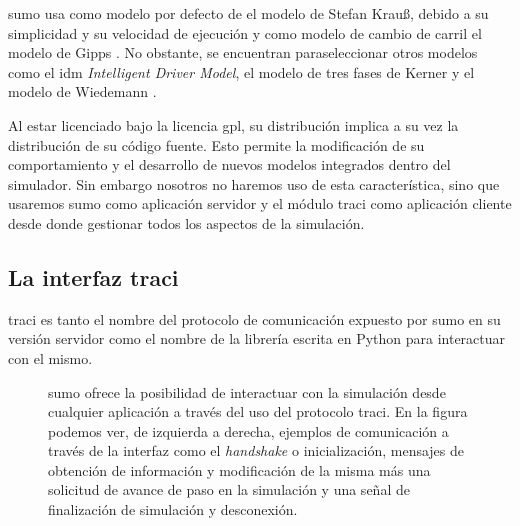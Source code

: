 \gls{sumo} usa como modelo por defecto de \textit{} el modelo de Stefan Krauß\cite{jin2016evaluation}, debido a su simplicidad y su velocidad de ejecución y como modelo de cambio de carril el modelo de Gipps \cite{krajzewicz2002sumo}. No obstante, se encuentran paraseleccionar otros modelos como el \gls{idm} \textit{Intelligent Driver Model}, el modelo de tres fases de Kerner \cite{kerner2008testbed} y el modelo de Wiedemann \cite{wiedemann1974simulation}.

Al estar licenciado bajo la licencia \gls{gpl}, su distribución implica a su vez la distribución de su código fuente. Esto permite la modificación de su comportamiento y el desarrollo de nuevos modelos integrados dentro del simulador. Sin embargo nosotros no haremos uso de esta característica, sino que usaremos \gls{sumo} como aplicación servidor y el módulo \gls{traci} como aplicación cliente desde donde gestionar todos los aspectos de la simulación.

\subsection{La interfaz \gls{traci}}

\gls{traci} \cite{Wegener2008} es tanto el nombre del protocolo de comunicación expuesto por \gls{sumo} en su versión servidor como el nombre de la librería escrita en Python para interactuar con el mismo.

\begin{figure}[!b]
	\centering
	\caption[Ejemplo de forma de envío de mensajes a través de TraCI]{\gls{sumo} ofrece la posibilidad de interactuar con la simulación desde cualquier aplicación a través del uso del protocolo \gls{traci}. En la figura podemos ver, de izquierda a derecha, ejemplos de comunicación a través de la interfaz como el \textit{handshake} o inicialización, mensajes de obtención de información y modificación de la misma más una solicitud de avance de paso en la simulación y una señal de finalización de simulación y desconexión.}
	\label{fig:traci-messages}
\end{figure}

